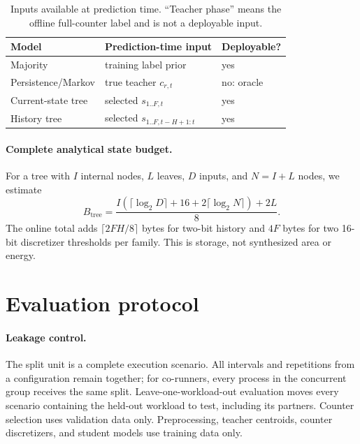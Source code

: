 \documentclass{article}
\begin{document}
\begin{table}[t]
  \caption{Inputs available at prediction time. ``Teacher phase'' means the offline
  full-counter label and is not a deployable input.}
  \label{tab:inputs}
  \centering
  \small
  \begin{tabular}{lll}
    \toprule
    Model & Prediction-time input & Deployable? \\
    \midrule
    Majority & training label prior & yes \\
    Persistence/Markov & true teacher $c_{r,t}$ & no: oracle \\
    Current-state tree & selected $s_{1..F,t}$ & yes \\
    History tree & selected $s_{1..F,t-H+1:t}$ & yes \\
    \bottomrule
  \end{tabular}
\end{table}

\paragraph{Complete analytical state budget.}
For a tree with $I$ internal nodes, $L$ leaves, $D$ inputs, and $N=I+L$ nodes, we
estimate
\begin{equation}
 B_{\mathrm{tree}}=
 \frac{I(\lceil\log_2D\rceil+16+2\lceil\log_2N\rceil)+2L}{8}.
\end{equation}
The online total adds $\lceil2FH/8\rceil$ bytes for two-bit history and $4F$ bytes for
two 16-bit discretizer thresholds per family. This is storage, not synthesized area or
energy.

\section{Evaluation protocol}

\paragraph{Leakage control.}
The split unit is a complete execution scenario. All intervals and repetitions from a
configuration remain together; for co-runners, every process in the concurrent group
receives the same split. Leave-one-workload-out evaluation moves every scenario
containing the held-out workload to test, including its partners. Counter selection
uses validation data only. Preprocessing, teacher centroids, counter discretizers, and
student models use training data only.
\end{document}
